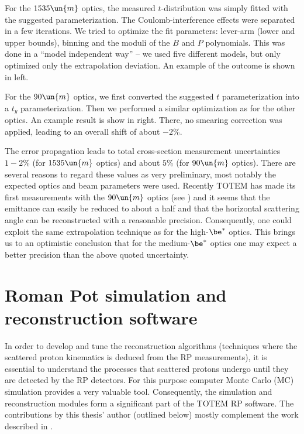 For the $1535\un{m}$ optics, the measured $t$-distribution was simply fitted with the suggested parameterization. The Coulomb-interference effects were separated in a few iterations. We tried to optimize the fit parameters: lever-arm (lower and upper bounds), binning and the moduli of the $B$ and $P$ polynomials. This was done in a ``model independent way'' -- we used five different models, but only optimized only the extrapolation deviation. An example of the outcome is shown in  left.

For the $90\un{m}$ optics, we first converted the suggested $t$ parameterization into a $t_y$ parameterization. Then we performed a similar optimization as for the other optics. An example result is show in  right. There, no smearing correction was applied, leading to an overall shift of about $-2\%$.


The error propagation leads to total cross-section measurement uncertainties $1-2\%$ (for $1535\un{m}$ optics) and about $5\%$ (for $90\un{m}$ optics). There are several reasons to regard these values as very preliminary, most notably the expected optics and beam parameters were used. Recently TOTEM has made its first measurements with the $90\un{m}$ optics (see ) and it seems that the emittance can easily be reduced to about a half and that the horizontal scattering angle can be reconstructed with a reasonable precision. Consequently, one could exploit the same extrapolation technique as for the high-$\be^*$ optics. This brings us to an optimistic conclusion that for the medium-$\be^*$ optics one may expect a better precision than the above quoted uncertainty.



\chapter[sr]{Roman Pot simulation and reconstruction software}

In order to develop and tune the reconstruction algorithms (techniques where the scattered proton kinematics is deduced from the RP measurements), it is essential to understand the processes that scattered protons undergo until they are detected by the RP detectors. For this purpose computer Monte Carlo (MC) simulation provides a very valuable tool. Consequently, the simulation and reconstruction modules form a significant part of the TOTEM RP software. The contributions by this thesis' author (outlined below) mostly complement the work described in .

